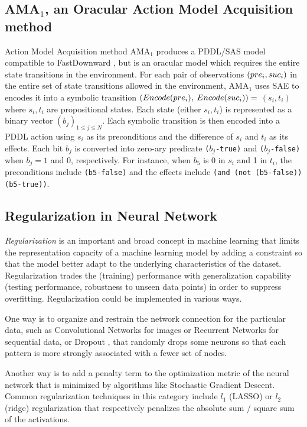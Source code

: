 \subsection{AMA$_1$, an Oracular Action Model Acquisition method}

Action Model Acquisition method AMA$_1$ produces a PDDL/SAS model compatible to
FastDownward \cite{Helmert04}, but is an oracular model which requires the entire state transitions
in the environment.
For each pair of observations ${\left(pre_i, suc_i\right)}$ in the entire set of state transitions allowed in the environment,
AMA$_1$ uses SAE to encodes it into 
a symbolic transition $(Encode(pre_i),$ $Encode(suc_i))=$ $(s_i,t_i)$ where $s_i,t_i$ are propositional states.
Each state (either $s_i,t_i$) is represented as a binary vector $(b_j)_{1\leq j \leq N}$.
Each symbolic transition is then encoded into a PDDL action 
using $s_i$ as its preconditions and the difference of $s_i$ and $t_i$ as its effects.
Each bit $b_j$ is converted into zero-ary predicate \texttt{($b_j$-true)} and \texttt{($b_j$-false)}
when $b_j=1$ and $0$, respectively.
For instance, when $b_5$ is 0 in $s_i$ and 1 in $t_i$,
the preconditions include \texttt{(b5-false)} and
the effects include \texttt{(and (not (b5-false)) (b5-true))}.

\subsection{Regularization in Neural Network}

\emph{Regularization} is an important and broad concept in machine learning
that limits the representation capacity of a machine learning model by adding a constraint
so that the model better adapt to the underlying characteristics of the dataset.
Regularization trades the (training) performance with generalization capability (testing performance, robustness to
unseen data points) in order to suppress overfitting.
Regularization could be implemented in various ways.

One way is to organize and restrain the network connection for the particular data,
such as Convolutional Networks for images
or Recurrent Networks for sequential data, or
Dropout \cite{srivastava2014dropout}, that randomly drops some neurons so
that each pattern is more strongly associated with a fewer set of nodes.

Another way is to add a penalty term to the optimization metric of the
neural network that is minimized by algorithms like Stochastic
Gradient Descent.
Common regularization techniques in this category include
$l_1$ (LASSO) or $l_2$ (ridge) regularization that respectively penalizes the absolute sum / square sum of the
activations.

